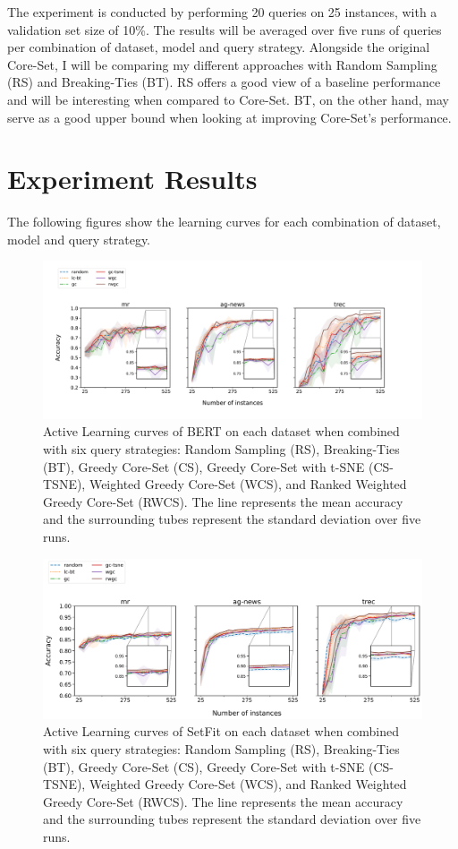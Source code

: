 \documentclass[english,bachelor,ul]{webisthesis} %
\begin{document}
The experiment is conducted by performing 20 queries on 25 instances, with a validation set size of 10\%. The results will be averaged over five runs of queries per combination of dataset, model and query strategy. Alongside the original Core-Set, I will be comparing my different approaches with Random Sampling (RS) and Breaking-Ties (BT). RS offers a good view of a baseline performance and will be interesting when compared to Core-Set. BT, on the other hand, may serve as a good upper bound when looking at improving Core-Set's performance. 


\section{Experiment Results}

The following figures show the learning curves for each combination of dataset, model and query strategy. 

\begin{figure}[htbp]
    \centering
    \includegraphics[width=1\textwidth]{img/bert-plots-1.png}
    \caption{Active Learning curves of BERT on each dataset when combined with six query strategies: Random Sampling (RS), Breaking-Ties (BT), Greedy Core-Set (CS), Greedy Core-Set with t-SNE (CS-TSNE), Weighted Greedy Core-Set (WCS), and Ranked Weighted Greedy Core-Set (RWCS). The line represents the mean accuracy and the surrounding tubes represent the standard deviation over five runs.}
    \label{fig:bert-curves}
\end{figure}

\begin{figure}[htbp]
    \centering
    \includegraphics[width=1\textwidth]{img/setfit-plots-1.png}
    \caption{Active Learning curves of SetFit on each dataset when combined with six query strategies: Random Sampling (RS), Breaking-Ties (BT), Greedy Core-Set (CS), Greedy Core-Set with t-SNE (CS-TSNE), Weighted Greedy Core-Set (WCS), and Ranked Weighted Greedy Core-Set (RWCS). The line represents the mean accuracy and the surrounding tubes represent the standard deviation over five runs.}
    \label{fig:setfit-curves}
\end{figure}
\end{document}
